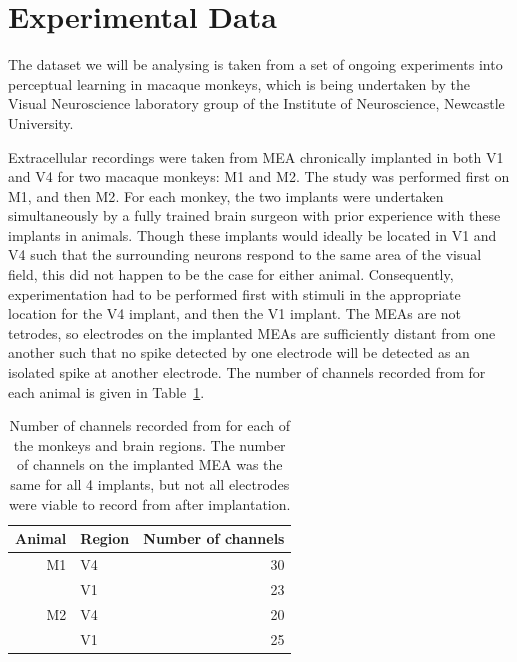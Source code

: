 \section{Experimental Data}
\label{ch:exp}

The dataset we will be analysing is taken from a set of ongoing experiments into perceptual learning in macaque monkeys, which is being undertaken by the Visual Neuroscience laboratory group of the Institute of Neuroscience, Newcastle University.

Extracellular recordings were taken from \ac{MEA} chronically implanted in both \ac{V1} and \ac{V4} for two macaque monkeys: \ac{M1} and \ac{M2}. The study was performed first on \ac{M1}, and then \ac{M2}. For each monkey, the two implants were undertaken simultaneously by a fully trained brain surgeon with prior experience with these implants in animals. Though these implants would ideally be located in \ac{V1} and \ac{V4} such that the surrounding neurons respond to the same area of the visual field, this did not happen to be the case for either animal. Consequently, experimentation had to be performed first with stimuli in the appropriate location for the \ac{V4} implant, and then the \ac{V1} implant.
The \acp{MEA} are not tetrodes, so electrodes on the implanted \acp{MEA} are sufficiently distant from one another such that no spike detected by one electrode will be detected as an isolated spike at another electrode. The number of channels recorded from for each animal is given in Table~\ref{tab:nchannels}.

\begin{table}[hbtp]
\caption{Number of channels recorded from for each of the monkeys and brain regions. The number of channels on the implanted \ac{MEA} was the same for all 4 implants, but not all electrodes were viable to record from after implantation.}
\label{tab:nchannels}
\begin{center}
\begin{tabular}{rlr}
\toprule
Animal  & Region & Number of channels
\\
\midrule
M1  & V4    & 30
\\
        & V1    & 23
\\
M2    & V4    & 20
\\
        & V1    & 25
\\
\bottomrule
\end{tabular}
\end{center}
\end{table}

